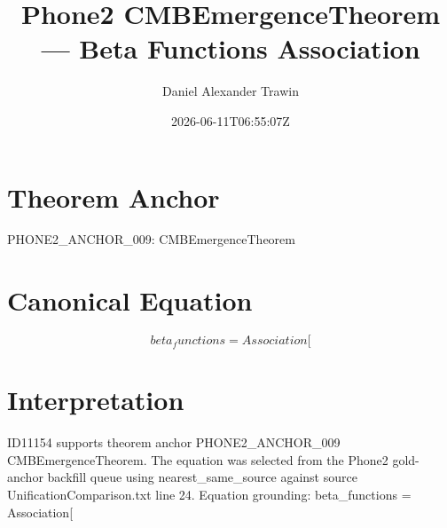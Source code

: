 \documentclass[11pt]{article}
\title{Phone2 CMBEmergenceTheorem — Beta Functions Association}
\author{Daniel Alexander Trawin}
\date{2026-06-11T06:55:07Z}
\begin{document}
\maketitle
\section*{Theorem Anchor}
PHONE2_ANCHOR_009: CMBEmergenceTheorem
\section*{Canonical Equation}
\[
beta_functions = Association[
\]
\section*{Interpretation}
ID11154 supports theorem anchor PHONE2_ANCHOR_009 CMBEmergenceTheorem. The equation was selected from the Phone2 gold-anchor backfill queue using nearest_same_source against source UnificationComparison.txt line 24. Equation grounding: beta_functions = Association[
\end{document}

